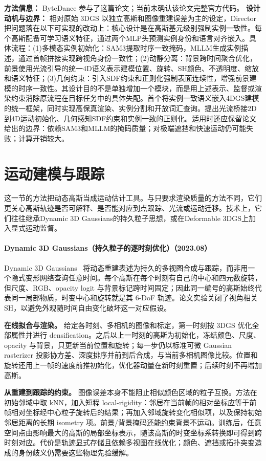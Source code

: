 \textbf{方法信息：} ByteDance 参与了这篇论文；当前未确认该论文完整官方代码。
\textbf{设计动机与边界：} 相对原始 3DGS 以独立高斯和图像重建误差为主的设定，Director 把问题落在以下可实现的改动上：核心设计是在高斯基元级别强制实例一致性。每个高斯配备可学习语义特征，通过两个MLP头预测实例身份和语言对齐嵌入。具体流程：(1)多模态实例初始化：SAM3提取时序一致掩码，MLLM生成实例描述，通过首帧拼接实现跨视角身份一致性；(2)动静分离：背景跨时间聚合优化，前景使用光流引导的统一4D语义表示建模位置、旋转、SH颜色、不透明度、缩放和语义特征；(3)几何约束：引入SDF约束和正则化强制表面连续性，增强前景建模的时序一致性。其设计目的不是单独增加一个模块，而是用上述表示、监督或渲染约束消除原流程在目标任务中的具体失配。首个将实例一致语义嵌入4DGS建模的统一框架，同时实现高保真渲染、实例分割和开放词汇查询。提出光流桥接2D到4D运动初始化、几何感知SDF约束和实例一致的正则化。适用时还应保留论文给出的边界：依赖SAM3和MLLM的掩码质量；对极端遮挡和快速运动仍可能失败；计算开销较大。

\section{运动建模与跟踪}

这一节的方法把动态高斯当成运动估计工具。与只要求渲染质量的方法不同，它们更关心高斯轨迹是否可解释、是否能对应到点跟踪、光流或运动迁移。技术上，它们往往继承Dynamic 3D Gaussians的持久粒子思想，或在Deformable 3DGS上加入显式运动监督。
\paragraph{Dynamic 3D Gaussians（持久粒子的逐时刻优化）（2023.08）}
Dynamic 3D Gaussians~\cite{2308_09713} 将动态重建表述为持久的多视图合成与跟踪，而非用一个隐式变形网络查询任意时间。每个高斯在每个时刻有自己的中心和四元数旋转，但尺度、RGB、opacity logit 与背景标记跨时间固定；因此同一编号的高斯始终代表同一局部物质，时变中心和旋转就是其 6-DoF 轨迹。论文实验关闭了视角相关 SH，以避免外观随时间自由变化破坏这一对应假设。

\textbf{在线拟合与渲染。} 给定各时刻、多相机的图像和标定，第一时刻按 3DGS 优化全部属性并进行 densification。之后以上一时刻的高斯为初始化，冻结颜色、尺度、opacity 与背景，只更新当前位置和旋转；每一步仍以标准可微 Gaussian rasterizer 投影协方差、深度排序并前到后合成，与当前多相机图像比较。位置和旋转还用上一帧的速度前推初始化，优化器动量在新时刻重置；后续时刻不再增加高斯。

\textbf{从重建到跟踪的约束。} 图像误差本身不能阻止相似颜色区域的粒子互换。方法在初始邻域中取 kNN，加入短程 local-rigidity：邻居在当前帧的相对坐标应等于前帧相对坐标经中心粒子旋转后的结果；再加入邻域旋转变化相似项，以及保持初始邻居距离的长期 isometry 项。前景/背景掩码还能约束背景不运动。训练后，任意空间点由影响最大的高斯的局部坐标表示，随该高斯的时变坐标系转换即可得到跨时刻对应。代价是轨迹显式存储且依赖多视图在线优化；颜色、遮挡或拓扑突变造成的身份歧义仍需要这些物理先验缓解。

